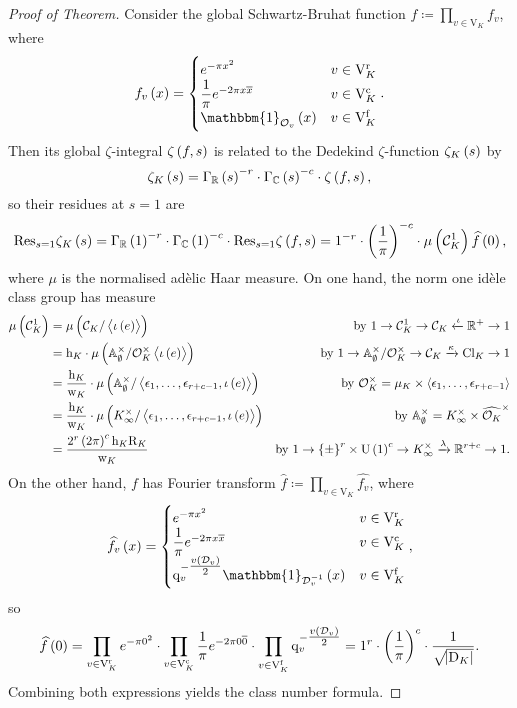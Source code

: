 \documentclass{article}
\newcommand{\1}{\mathbbm{1}}
\renewcommand{\AA}{\mathbb{A}}
\newcommand{\br}{\del}
\renewcommand{\c}{\mathrm{c}}
\newcommand{\CC}{\mathbb{C}}
\newcommand{\CCC}{\mathcal{C}}
\newcommand{\Cl}{\mathrm{Cl}}
\newcommand{\D}{\mathrm{D}}
\newcommand{\DDD}{\mathcal{D}}
\newcommand{\f}{\mathrm{f}}
\newcommand{\h}{\mathrm{h}}
\newcommand{\OOO}{\mathcal{O}}
\newcommand{\q}{\mathrm{q}}
\renewcommand{\r}{\mathrm{r}}
\newcommand{\R}{\mathrm{R}}
\newcommand{\Res}{\mathrm{Res}}
\newcommand{\RR}{\mathbb{R}}
\newcommand{\U}{\mathrm{U}}
\newcommand{\V}{\mathrm{V}}
\newcommand{\w}{\mathrm{w}}
\newcommand{\abr}[1]{\left\langle #1 \right\rangle}
\begin{document}
\begin{proof}[Proof of Theorem]
Consider the global Schwartz-Bruhat function $ f \coloneqq \prod_{v \in \V_K} f_v $, where
$$ f_v\br{x} =
\begin{cases}
e^{-\pi x^2} & v \in \V_K^\r \\
\dfrac{1}{\pi}e^{-2\pi x\overline{x}} & v \in \V_K^\c \\
\1_{\OOO_v}\br{x} & v \in \V_K^\f
\end{cases}.
$$
Then its global $ \zeta $-integral $ \zeta\br{f, s} $ is related to the Dedekind $ \zeta $-function $ \zeta_K\br{s} $ by
$$ \zeta_K\br{s} = \Gamma_\RR\br{s}^{-r} \cdot \Gamma_\CC\br{s}^{-c} \cdot \zeta\br{f, s}, $$
so their residues at $ s = 1 $ are
$$ \Res_{s = 1} \zeta_K\br{s} = \Gamma_\RR\br{1}^{-r} \cdot \Gamma_\CC\br{1}^{-c} \cdot \Res_{s = 1} \zeta\br{f, s} = 1^{-r} \cdot \br{\dfrac{1}{\pi}}^{-c} \cdot \mu\br{\CCC_K^1}\widehat{f}\br{0}, $$
where $ \mu $ is the normalised ad\`elic Haar measure. On one hand, the norm one id\`ele class group has measure
\begin{align*}
\mu\br{\CCC_K^1}
& = \mu\br{\CCC_K / \abr{\iota\br{e}}} & \text{by} \ 1 \to \CCC_K^1 \to \CCC_K \xleftarrow{\iota} \RR^+ \to 1 \\
& = \h_K \cdot \mu\br{\AA_\emptyset^\times / \OOO_K^\times\abr{\iota\br{e}}} & \text{by} \ 1 \to \AA_\emptyset^\times / \OOO_K^\times \to \CCC_K \xrightarrow{\kappa} \Cl_K \to 1 \\
& = \dfrac{\h_K}{\w_K} \cdot \mu\br{\AA_\emptyset^\times / \abr{\epsilon_1, \dots, \epsilon_{r + c - 1}, \iota\br{e}}} & \text{by} \ \OOO_K^\times = \mu_K \times \abr{\epsilon_1, \dots, \epsilon_{r + c - 1}} \\
& = \dfrac{\h_K}{\w_K} \cdot \mu\br{K_\infty^\times / \abr{\epsilon_1, \dots, \epsilon_{r + c - 1}, \iota\br{e}}} & \text{by} \ \AA_\emptyset^\times = K_\infty^\times \times \widehat{\OOO_K}^\times \\
& = \dfrac{2^{r}\br{2\pi}^{c}\h_K\R_K}{\w_K} & \text{by} \ 1 \to \cbr{\pm}^{r} \times \U\br{1}^{c} \to K_\infty^\times \xrightarrow{\lambda} \RR^{r + c} \to 1.
\end{align*}
On the other hand, $ f $ has Fourier transform $ \widehat{f} \coloneqq \prod_{v \in \V_K} \widehat{f_v} $, where
$$ \widehat{f_v}\br{x} =
\begin{cases}
e^{-\pi x^2} & v \in \V_K^\r \\
\dfrac{1}{\pi}e^{-2\pi x\overline{x}} & v \in \V_K^\c \\
\q_v^{-\tfrac{v\br{\DDD_v}}{2}}\1_{\DDD_v^{-1}}\br{x} & v \in \V_K^\f
\end{cases},
$$
so
$$ \widehat{f}\br{0} = \prod_{v \in \V_K^\r} e^{-\pi0^2} \cdot \prod_{v \in \V_K^\c} \dfrac{1}{\pi}e^{-2\pi0\overline{0}} \cdot \prod_{v \in \V_K^\f} \q_v^{-\tfrac{v\br{\DDD_v}}{2}} = 1^{r} \cdot \br{\dfrac{1}{\pi}}^{c} \cdot \dfrac{1}{\sqrt{\abs{\D_K}}}. $$
Combining both expressions yields the class number formula.
\end{proof}
\end{document}
